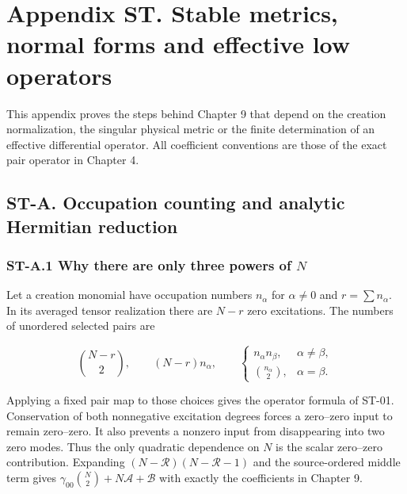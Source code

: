 \documentclass[a4paper,11pt]{article}
\numberwithin{equation}{section}
\begin{document}
\clearpage
\hypertarget{appendix-st.-stable-metrics-normal-forms-and-effective-low-operators}{%
\section{Appendix ST. Stable metrics, normal forms and effective low operators}\label{appendix-st.-stable-metrics-normal-forms-and-effective-low-operators}}

This appendix proves the steps behind Chapter 9 that depend on the creation normalization, the singular physical metric or the finite determination of an effective differential operator. All coefficient conventions are those of the exact pair operator in Chapter 4.

\hypertarget{st-a.-occupation-counting-and-analytic-hermitian-reduction}{%
\subsection{ST-A. Occupation counting and analytic Hermitian reduction}\label{st-a.-occupation-counting-and-analytic-hermitian-reduction}}

\hypertarget{st-a.1-why-there-are-only-three-powers-of-n}{%
\subsubsection{\texorpdfstring{ST-A.1 Why there are only three powers of \(N\)}{ST-A.1 Why there are only three powers of N}}\label{st-a.1-why-there-are-only-three-powers-of-n}}

Let a creation monomial have occupation numbers \(n_\alpha\) for \(\alpha\ne0\) and \(r=\sum n_\alpha\). In its averaged tensor realization there are \(N-r\) zero excitations. The numbers of unordered selected pairs are

\[
\binom{N-r}{2},\qquad (N-r)n_\alpha,\qquad
\begin{cases}
n_\alpha n_\beta,&\alpha\ne\beta,\\
\binom{n_\alpha}{2},&\alpha=\beta.
\end{cases}
\]

Applying a fixed pair map to those choices gives the operator formula of ST-01. Conservation of both nonnegative excitation degrees forces a zero--zero input to remain zero--zero. It also prevents a nonzero input from disappearing into two zero modes. Thus the only quadratic dependence on \(N\) is the scalar zero--zero contribution. Expanding \((N-\mathcal R)(N-\mathcal R-1)\) and the source-ordered middle term gives \(\gamma_{00}\binom N2+N\mathscr A+\mathscr B\) with exactly the coefficients in Chapter 9.
\end{document}
